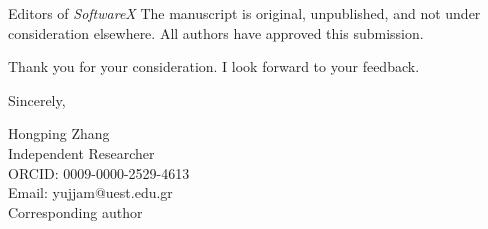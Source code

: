 \documentclass[10pt]{letter}
\begin{document}
\begin{letter}{Editors of \textit{SoftwareX}}
The manuscript is original, unpublished, and not under consideration elsewhere. All authors have approved this submission.

Thank you for your consideration. I look forward to your feedback.

\closing{Sincerely,}

\noindent
Hongping Zhang\textsuperscript{\textdagger} \\
Independent Researcher \\
ORCID: 0009-0000-2529-4613 \\
Email: yujjam@uest.edu.gr \\
\textsuperscript{\textdagger}Corresponding author

\end{letter}
\end{document}
